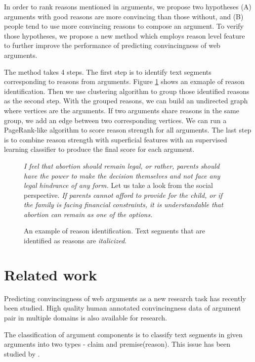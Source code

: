 \documentclass[11pt,a4paper]{article}
\begin{document}
In order to rank reasons mentioned in arguments, we propose two hypotheses (A) arguments with good reasons are more convincing than those without, and (B) people tend to use more convincing reasons to compose an argument. To verify those hypotheses, we propose a new method which employs reason level feature to further improve the performance of predicting convincingness of web arguments.

The method takes 4 steps. The first step is to identify text segments corresponding to reasons from arguments. Figure \ref{figure:reasonidentification} shows an exmaple of reason identification. Then we use clustering algorithm to group those identified reasons as the second step. With the grouped reasons, we can build an undirected graph where vertices are the arguments. If two arguments share reasons in the same group, we add an edge between two corresponding vertices. We can run a PageRank-like algorithm to score reason strength for all arguments. The last step is to combine reason strength with superficial features with an supervised learning classifier to produce the final score for each argument.  

\begin{figure}

{\it I feel that abortion should remain legal, or rather, parents should have the power to make the decision themselves and not face any legal hindrance of any form.} Let us take a look from the social perspective. {\it If parents cannot afford to provide for the child, or if the family is facing financial constraints, it is understandable that abortion can remain as one of the options.}


\caption{An example of reason identification. Text segments that are identified as reasons are {\it italicized}.} 
\label{figure:reasonidentification}
\end{figure}


\section{Related work}

Predicting convincingness of web arguments as a new research task has recently been studied\cite{habernal2016argument}. High quality human annotated convincingness data of argument pair in multiple domains is also available for research\cite{habernal2016argument}. 

The classification of argument components is to classify text segments in given arguments into two types - claim and premise(reason)\cite{stab2014argumentation}. This issue has been studied by \cite{rooney2012applying,feng2011classifying,palau2009argumentation}. 
\end{document}

